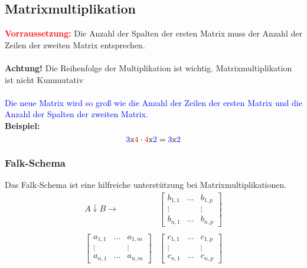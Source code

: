 \documentclass[12pt,a4paper]{article}
\begin{document}
\subsection{Matrixmultiplikation}
\textbf{\textcolor{red}{Vorraussetzung:}} Die Anzahl der Spalten der ersten Matrix muss der Anzahl der Zeilen der zweiten Matrix entsprechen. \\ \\
\textbf{Achtung!} Die Reihenfolge der Multiplikation ist wichtig. Matrixmultiplikation ist nicht Kummutativ\\ \\
\textcolor{blue}{Die neue Matrix wird so groß wie die Anzahl der Zeilen der ersten Matrix und die Anzahl der Spalten der zweiten Matrix.} \\
\textbf{Beispiel:}
\[
\textcolor{blue}{3}\text{x}\textcolor{red}{4} \cdot \textcolor{red}{4}\text{x}\textcolor{blue}{2} = \textcolor{blue}{3}\text{x}\textcolor{blue}{2}
\]
\subsubsection{Falk-Schema}
Das Falk-Schema ist eine hilfreiche unterstützung bei Matrixmultiplikationen. \\
\[
\begin{matrix}
A \downarrow B \rightarrow  & \begin{bmatrix}
       b_{1,1} & \dots & b_{1,p} \\
         \vdots &  & \vdots \\
         b_{n, 1} & \dots & b_{n, p}
        \end{bmatrix} \\ \\
\begin{bmatrix}
a_{1,1} & \dots & a_{1,m} \\
\vdots &  & \vdots \\
a_{n,1} & \dots & a_{n,m}
\end{bmatrix} & \begin{bmatrix}
c_{1,1} & \dots & c_{1,p} \\
\vdots &  & \vdots \\
c_{n,1} & \dots & c_{n,p}
\end{bmatrix}
\end{matrix}
\]
\end{document}
